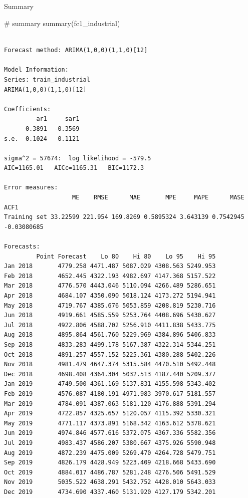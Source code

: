 \documentclass[
  letterpaper,
  DIV=11,
  numbers=noendperiod]{scrartcl}
\makeatletter
\let\oldsubparagraph\subparagraph
\renewcommand{\subparagraph}{
    \@ifstar
      \xxxSubParagraphStar
      \xxxSubParagraphNoStar
  }
\newcommand{\xxxSubParagraphStar}[1]{\oldsubparagraph*{#1}\mbox{}}
\newcommand{\xxxSubParagraphNoStar}[1]{\oldsubparagraph{#1}\mbox{}}
\newenvironment{Shaded}{\begin{snugshade}}{\end{snugshade}}
\newcommand{\CommentTok}[1]{\textcolor[rgb]{0.37,0.37,0.37}{#1}}
\newcommand{\FunctionTok}[1]{\textcolor[rgb]{0.28,0.35,0.67}{#1}}
\newcommand{\NormalTok}[1]{\textcolor[rgb]{0.00,0.23,0.31}{#1}}
\makeatother
\begin{document}
\subparagraph{Summary}\label{summary}

\begin{Shaded}
\begin{Highlighting}[]
\CommentTok{\# summary }
\FunctionTok{summary}\NormalTok{(fc1\_industrial)}
\end{Highlighting}
\end{Shaded}

\begin{verbatim}

Forecast method: ARIMA(1,0,0)(1,1,0)[12]

Model Information:
Series: train_industrial 
ARIMA(1,0,0)(1,1,0)[12] 

Coefficients:
         ar1     sar1
      0.3891  -0.3569
s.e.  0.1024   0.1121

sigma^2 = 57674:  log likelihood = -579.5
AIC=1165.01   AICc=1165.31   BIC=1172.3

Error measures:
                   ME    RMSE      MAE       MPE     MAPE      MASE        ACF1
Training set 33.22599 221.954 169.8269 0.5895324 3.643139 0.7542945 -0.03080685

Forecasts:
         Point Forecast    Lo 80    Hi 80    Lo 95    Hi 95
Jan 2018       4779.258 4471.487 5087.029 4308.563 5249.953
Feb 2018       4652.445 4322.193 4982.697 4147.368 5157.522
Mar 2018       4776.570 4443.046 5110.094 4266.489 5286.651
Apr 2018       4684.107 4350.090 5018.124 4173.272 5194.941
May 2018       4719.767 4385.676 5053.859 4208.819 5230.716
Jun 2018       4919.661 4585.559 5253.764 4408.696 5430.627
Jul 2018       4922.806 4588.702 5256.910 4411.838 5433.775
Aug 2018       4895.864 4561.760 5229.969 4384.896 5406.833
Sep 2018       4833.283 4499.178 5167.387 4322.314 5344.251
Oct 2018       4891.257 4557.152 5225.361 4380.288 5402.226
Nov 2018       4981.479 4647.374 5315.584 4470.510 5492.448
Dec 2018       4698.408 4364.304 5032.513 4187.440 5209.377
Jan 2019       4749.500 4361.169 5137.831 4155.598 5343.402
Feb 2019       4576.087 4180.191 4971.983 3970.617 5181.557
Mar 2019       4784.091 4387.063 5181.120 4176.888 5391.294
Apr 2019       4722.857 4325.657 5120.057 4115.392 5330.321
May 2019       4771.117 4373.891 5168.342 4163.612 5378.621
Jun 2019       4974.846 4577.616 5372.075 4367.336 5582.356
Jul 2019       4983.437 4586.207 5380.667 4375.926 5590.948
Aug 2019       4872.239 4475.009 5269.470 4264.728 5479.751
Sep 2019       4826.179 4428.949 5223.409 4218.668 5433.690
Oct 2019       4884.017 4486.787 5281.248 4276.506 5491.529
Nov 2019       5035.522 4638.291 5432.752 4428.010 5643.033
Dec 2019       4734.690 4337.460 5131.920 4127.179 5342.201
\end{verbatim}
\end{document}

